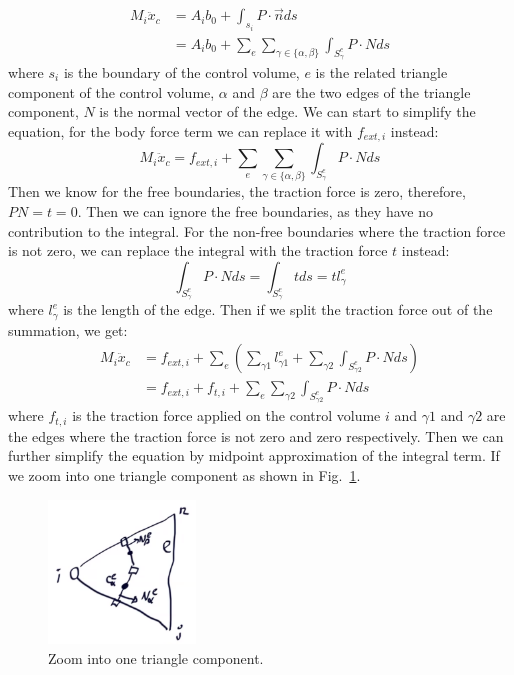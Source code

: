 \documentclass[acmtog]{acmart}
\begin{document}
\begin{align*}
    M_i \ddot{x}_c &= A_i b_0 + \int_{s_i} P \cdot \vec{n} ds \\
    &= A_i b_0 + \sum_{e} \sum_{\gamma \in \{\alpha, \beta\}} \int_{S_{\gamma}^e} P \cdot N ds
\end{align*}
where $s_i$ is the boundary of the control volume, $e$ is the related triangle component of the control volume, $\alpha$ and $\beta$ are the two edges of the triangle component, $N$ is the normal vector of the edge. We can start to simplify the equation, for the body force term we can replace it with $f_{ext, i}$ instead:
\begin{equation*}
  M_i \ddot{x}_c = f_{ext, i} + \sum_{e} \sum_{\gamma \in \{\alpha, \beta\}} \int_{S_{\gamma}^e} P \cdot N ds
\end{equation*}
Then we know for the free boundaries, the traction force is zero, therefore, $PN=t=0$. Then we can ignore the free boundaries, as they have no contribution to the integral. For the non-free boundaries where the traction force is not zero, we can replace the integral with the traction force $t$ instead:
\begin{equation*}
  \int_{S_{\gamma}^e} P \cdot N ds = \int_{S_{\gamma}^e} t ds=t l_{\gamma}^e
\end{equation*}
where $l_{\gamma}^e$ is the length of the edge. Then if we split the traction force out of the summation, we get:
\begin{align*}
  M_i \ddot{x}_c &= f_{ext, i} + \sum_{e} \left ( \sum_{\gamma1} l_{\gamma1}^e + \sum_{\gamma2} \int_{S_{\gamma2}^e} P \cdot N ds \right) \\
  &= f_{ext, i} + f_{t, i} + \sum_{e} \sum_{\gamma2} \int_{S_{\gamma2}^e} P \cdot N ds
\end{align*}
where $f_{t, i}$ is the traction force applied on the control volume $i$ and $\gamma1$ and $\gamma2$ are the edges where the traction force is not zero and zero respectively. Then we can further simplify the equation by midpoint approximation of the integral term. If we zoom into one triangle component as shown in Fig.~\ref{fig:zoom}.

\begin{figure}[H]
  \centering
  \includegraphics[width=0.35\textwidth]{images/zoom.png}
  \caption{Zoom into one triangle component.}
  \label{fig:zoom}
\end{figure}
\end{document}
